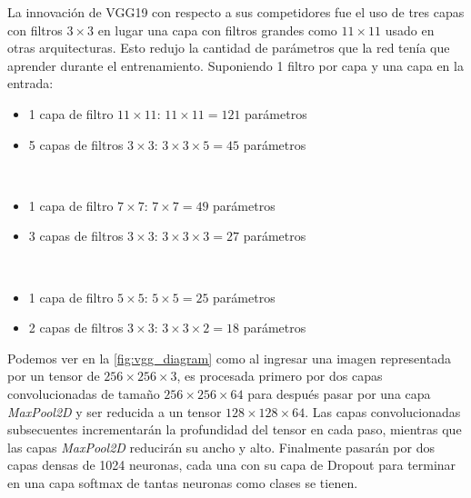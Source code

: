 La innovación de VGG19 con respecto a sus competidores fue el uso de tres capas
con filtros $ 3 \times 3 $ en lugar una capa con filtros grandes como $11 \times
11$ usado en otras arquitecturas. Esto redujo la cantidad de parámetros
que la red tenía que aprender durante el entrenamiento. Suponiendo
1 filtro por capa y una capa en la entrada:
\leavevmode \\
\begin{itemize}
    \item 1 capa de filtro $11 \times 11$: $11 \times 11 = 121$ parámetros
    \item 5 capas de filtros $3 \times 3$: $3 \times 3 \times 5 = 45$ parámetros %
  \end{itemize}
  \leavevmode \\
\begin{itemize}
\item 1 capa de filtro $7 \times 7$: $7 \times 7 = 49$ parámetros
\item 3 capas de filtros $3 \times 3$: $3 \times 3 \times 3 = 27$ parámetros %
\end{itemize}\leavevmode \\

\begin{itemize}
\item 1 capa de filtro $5 \times 5 $: $5 \times 5 = 25$ parámetros
\item 2 capas de filtros $3 \times 3$: $3 \times 3 \times 2 = 18$ parámetros %
\end{itemize}

Podemos ver en la \autoref{fig:vgg_diagram} como al ingresar una imagen
representada por un tensor de $256 \times 256 \times 3$, es procesada primero
por dos capas convolucionadas de tamaño $256 \times 256 \times 64$ para después
pasar por una capa \emph{MaxPool2D} y ser reducida a un tensor $128 \times 128
\times 64$. Las capas convolucionadas subsecuentes incrementarán la profundidad
del tensor en cada paso, mientras que las capas \emph{MaxPool2D} reducirán su
ancho y alto. Finalmente pasarán por dos capas densas de 1024 neuronas, cada una
con su capa de Dropout para terminar en una capa softmax de tantas neuronas como
clases se tienen.

